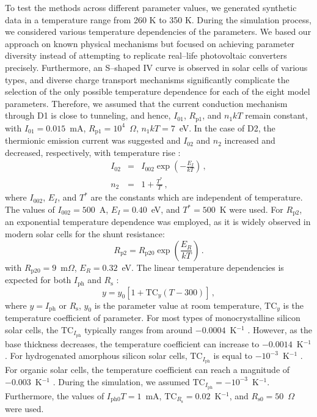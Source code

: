 \documentclass[a4paper,fleqn]{cas-dc}
\begin{document}
To test the methods across different parameter values, we generated synthetic data in a temperature range from 260 K to 350 K.
During the simulation process, we considered various temperature dependencies of the parameters.
We based our approach on known physical mechanisms but focused on achieving parameter diversity 
instead of attempting to replicate real--life photovoltaic converters precisely.
Furthermore, an S--shaped IV curve is observed in solar cells of various types, 
and diverse charge transport mechanisms significantly complicate the selection of 
the only possible temperature dependence for each of the eight model parameters.
Therefore, we assumed that the current conduction mechanism through D1 is close to tunneling, 
and hence, $I_{01}$, $R_\mathrm{p1}$, and $n_1kT$ remain constant, 
with $I_{01}=0.015$~mA, $R_\mathrm{p1}=10^4$~$\Omega$, $n_1kT=7$~eV.
In the case of D2, the thermionic emission current was suggested 
and $I_{02}$ and $n_2$ increased and decreased, respectively, with temperature rise \cite{Sze2012}: 
\begin{eqnarray}
I_{02}&=& I_{002}\exp\left(-\frac{E_I}{kT}\right)\,,\\
n_2&=&1+\frac{T^*}{T}\,,
\end{eqnarray}
where $I_{002}$, $E_I$, and $T^*$ are the constants which are independent of temperature. 
The values of $I_{002}=500$~A, $E_I=0.40$~eV, and $T^*=500$~K were used.
For $R_\mathrm{p2}$, an exponential temperature dependence was employed, 
as it is widely observed \cite{Kondratenko2019} in modern solar cells for the shunt resistance:
\begin{equation}
R_\mathrm{p2}=R_\mathrm{p20}\exp\left(\frac{E_R}{kT}\right)\,.
\end{equation}
with
$R_\mathrm{p20}=9$~m$\Omega$,
$E_R=0.32$~eV.
The linear temperature dependencies is expected for both $I_\mathrm{ph}$ \cite{Green2003,Eberle2021} and $R_\mathrm{s}$ \cite{Ibrahim2017,Bradaschia2019}: 
\begin{equation}
y=y_{0}[1+\mathrm{TC}_y(T-300)]\,,
\end{equation}
where
$y=I_\mathrm{ph}$ or $R_\mathrm{s}$,
$y_0$ is the parameter value at room temperature,
$\mathrm{TC}_y$ is the temperature coefficient of parameter.
For most types of monocrystalline silicon solar cells, the $\mathrm{TC}_{I_\mathrm{ph}}$ typically ranges from around $-0.0004$~K$^{-1}$ \cite{TuanLe2021}. 
However, as the base thickness decreases, the temperature coefficient can increase to $-0.0014$~K$^{-1}$ \cite{Dupre2016}.
For hydrogenated amorphous silicon solar cells, $\mathrm{TC}_{I_\mathrm{ph}}$ is equal to $-10^{-3}$~K$^{-1}$ \cite{Riesen2016}.
For organic solar cells, the temperature coefficient can reach a magnitude of $-0.003$~K$^{-1}$ \cite{Rana2018}.
During the simulation, we assumed $\mathrm{TC}_{I_\mathrm{ph}}=-10^{-3}$~K$^{-1}$. 
Furthermore, the values of $I_\mathrm{ph0}T=1$~mA, 
$\mathrm{TC}_{R_\mathrm{s}}=0.02$~K$^{-1}$, 
and $R_\mathrm{s0}=50$~$\Omega$ were used.
\end{document}
